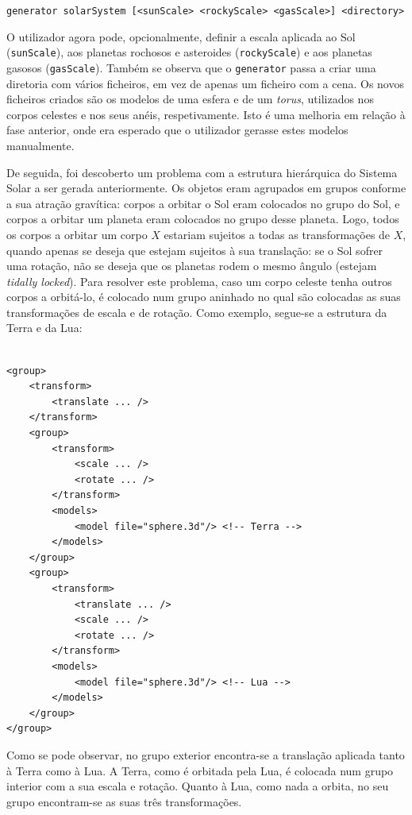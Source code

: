 \documentclass[12pt, a4paper]{article}
\begin{document}
\begin{center}
\texttt{generator solarSystem [<sunScale> <rockyScale> <gasScale>] <directory>}
\end{center}

O utilizador agora pode, opcionalmente, definir a escala aplicada ao Sol (\texttt{sunScale}), aos
planetas rochosos e asteroides (\texttt{rockyScale}) e aos planetas gasosos (\texttt{gasScale}).
Também se observa que o \texttt{generator} passa a criar uma diretoria com vários ficheiros, em vez
de apenas um ficheiro com a cena. Os novos ficheiros criados são os modelos de uma esfera e de um
\emph{torus}, utilizados nos corpos celestes e nos seus anéis, respetivamente. Isto é uma melhoria
em relação à fase anterior, onde era esperado que o utilizador gerasse estes modelos manualmente.

De seguida, foi descoberto um problema com a estrutura hierárquica do Sistema Solar a ser gerada
anteriormente. Os objetos eram agrupados em grupos conforme a sua atração gravítica: corpos a
orbitar o Sol eram colocados no grupo do Sol, e corpos a orbitar um planeta eram colocados no grupo
desse planeta. Logo, todos os corpos a orbitar um corpo $X$ estariam sujeitos a todas as
transformações de $X$, quando apenas se deseja que estejam sujeitos à sua translação: se o Sol
sofrer uma rotação, não se deseja que os planetas rodem o mesmo ângulo (estejam
\emph{tidally locked}). Para resolver este problema, caso um corpo celeste tenha outros corpos a
orbitá-lo, é colocado num grupo aninhado no qual são colocadas as suas transformações de escala e de
rotação. Como exemplo, segue-se a estrutura da Terra e da Lua:

\lstset{language=xml}
\begin{lstlisting}

<group>
    <transform>
        <translate ... />
    </transform>
    <group>
        <transform>
            <scale ... />
            <rotate ... />
        </transform>
        <models>
            <model file="sphere.3d"/> <!-- Terra -->
        </models>
    </group>
    <group>
        <transform>
            <translate ... />
            <scale ... />
            <rotate ... />
        </transform>
        <models>
            <model file="sphere.3d"/> <!-- Lua -->
        </models>
    </group>
</group>
\end{lstlisting}

Como se pode observar, no grupo exterior encontra-se a translação aplicada tanto à Terra como à Lua.
A Terra, como é orbitada pela Lua, é colocada num grupo interior com a sua escala e rotação. Quanto
à Lua, como nada a orbita, no seu grupo encontram-se as suas três transformações.
\end{document}
